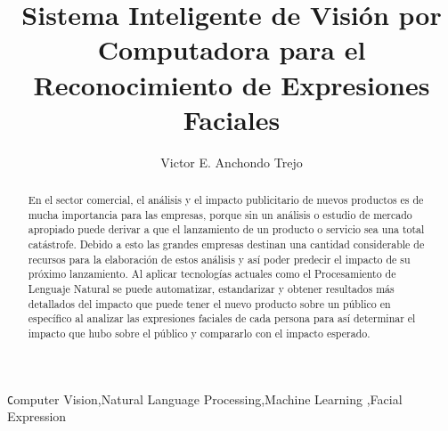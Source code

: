 
\begin{frontmatter}

\title{Sistema Inteligente de Visión por Computadora para el Reconocimiento de Expresiones Faciales}

\author{Victor E. Anchondo Trejo}
\address{Montana 2038, Chihuahua, Chihuahua, México}

\begin{abstract}
    En el sector comercial, el análisis y el impacto publicitario de nuevos productos es de mucha importancia para las empresas, porque sin un análisis o estudio de mercado apropiado puede derivar a que el lanzamiento de un producto o servicio sea una total catástrofe.  Debido a esto las grandes empresas destinan una cantidad considerable de recursos para la elaboración de estos análisis y así poder predecir el impacto de su próximo lanzamiento.
    Al aplicar tecnologías actuales como el Procesamiento de Lenguaje Natural se puede automatizar, estandarizar y obtener resultados más detallados del impacto que puede tener el nuevo producto sobre un público en específico al analizar las expresiones faciales de cada persona para así determinar el impacto que hubo sobre el público y compararlo con el impacto esperado.
\end{abstract}

\begin{keyword}
\texttt Computer Vision\sep Natural Language Processing\sep Machine Learning \sep Facial Expression
\end{keyword}

\end{frontmatter}
